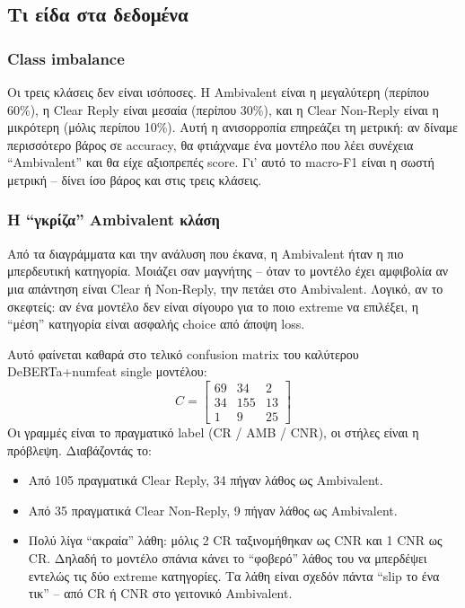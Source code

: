 \documentclass[12pt]{fphw}
\begin{document}
\subsection{Τι είδα στα δεδομένα}

\subsubsection{Class imbalance}

Οι τρεις κλάσεις δεν είναι ισόποσες. Η Ambivalent είναι η μεγαλύτερη (περίπου 60\%), η Clear Reply είναι μεσαία (περίπου 30\%), και η Clear Non-Reply είναι η μικρότερη (μόλις περίπου 10\%). Αυτή η ανισορροπία επηρεάζει τη μετρική: αν δίναμε περισσότερο βάρος σε accuracy, θα φτιάχναμε ένα μοντέλο που λέει συνέχεια ``Ambivalent'' και θα είχε αξιοπρεπές score. Γι' αυτό το macro-F1 είναι η σωστή μετρική -- δίνει ίσο βάρος και στις τρεις κλάσεις.

\subsubsection{Η ``γκρίζα'' Ambivalent κλάση}

Από τα διαγράμματα και την ανάλυση που έκανα, η Ambivalent ήταν η πιο μπερδευτική κατηγορία. Μοιάζει σαν μαγνήτης -- όταν το μοντέλο έχει αμφιβολία αν μια απάντηση είναι Clear ή Non-Reply, την πετάει στο Ambivalent. Λογικό, αν το σκεφτείς: αν ένα μοντέλο δεν είναι σίγουρο για το ποιο extreme να επιλέξει, η ``μέση'' κατηγορία είναι ασφαλής choice από άποψη loss.

Αυτό φαίνεται καθαρά στο τελικό confusion matrix του καλύτερου DeBERTa+numfeat single μοντέλου:
\[
C = \begin{bmatrix}
69 & 34 & 2 \\
34 & 155 & 13 \\
1 & 9 & 25
\end{bmatrix}
\]
Οι γραμμές είναι το πραγματικό label (CR / AMB / CNR), οι στήλες είναι η πρόβλεψη. Διαβάζοντάς το:
\begin{itemize}
    \item Από 105 πραγματικά Clear Reply, 34 πήγαν λάθος ως Ambivalent.
    \item Από 35 πραγματικά Clear Non-Reply, 9 πήγαν λάθος ως Ambivalent.
    \item Πολύ λίγα ``ακραία'' λάθη: μόλις 2 CR ταξινομήθηκαν ως CNR και 1 CNR ως CR. Δηλαδή το μοντέλο σπάνια κάνει το ``φοβερό'' λάθος του να μπερδέψει εντελώς τις δύο extreme κατηγορίες. Τα λάθη είναι σχεδόν πάντα ``slip το ένα τικ'' -- από CR ή CNR στο γειτονικό Ambivalent.
\end{itemize}
\end{document}
